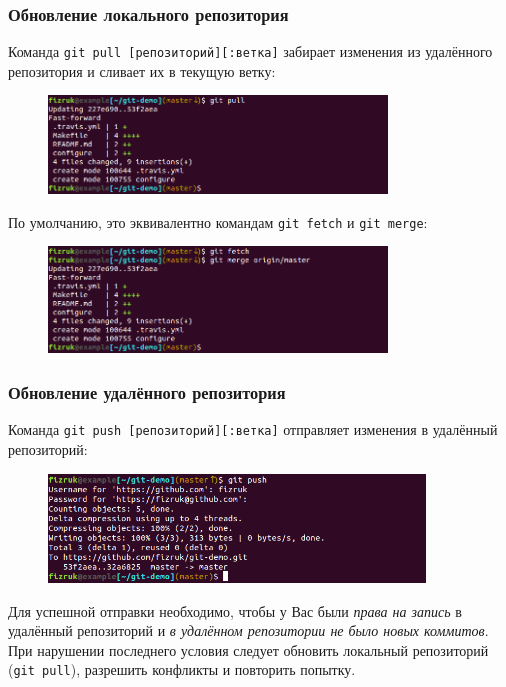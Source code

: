 \documentclass{beamer}
\begin{document}
\begin{frame}
  \frametitle{Обновление локального репозитория}
  Команда \texttt{git pull [репозиторий][:ветка]} забирает изменения из 
  удалённого репозитория и сливает их в текущую ветку:

  \begin{figure}
    \includegraphics[width=9cm]{images/git-pull.png}
  \end{figure}

  По умолчанию, это эквивалентно командам \texttt{git fetch} и \texttt{git merge}:

  \begin{figure}
    \includegraphics[width=9cm]{images/git-fetch-merge.png}
  \end{figure}
\end{frame}

\begin{frame}
  \frametitle{Обновление удалённого репозитория}
  Команда \texttt{git push [репозиторий][:ветка]} отправляет
  изменения в удалённый репозиторий:

  \begin{figure}
    \includegraphics[width=10cm]{images/git-push.png}
  \end{figure}

  Для успешной отправки необходимо, чтобы у Вас были {\it права на запись} в удалённый репозиторий и 
  {\it в удалённом репозитории не было новых коммитов}. При нарушении последнего условия следует
  обновить локальный репозиторий (\texttt{git pull}), разрешить конфликты и повторить попытку.
\end{frame}
\end{document}
